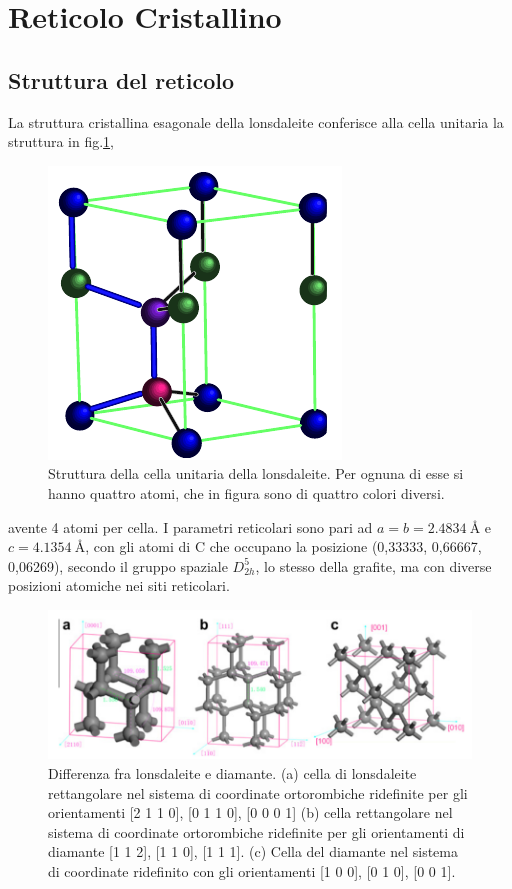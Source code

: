 \documentclass[a4paper,titlepage]{book}
\begin{document}
\section{Reticolo Cristallino}
\subsection{Struttura del reticolo}
La struttura cristallina esagonale della lonsdaleite conferisce alla cella unitaria la struttura in fig.\ref{lonsda},
\begin{figure}[h!] 
	\centering
	\includegraphics[width=0.5\columnwidth]{unitcelllonsda.png}
	\caption{ 	\label{lonsda}
		Struttura della cella unitaria della lonsdaleite. Per ognuna di esse si hanno quattro atomi, che in figura sono di quattro colori diversi.
	}
\end{figure}
avente 4 atomi per cella. I parametri reticolari sono pari ad $a = b = \SI{2.4834}{\angstrom}$ e $c = \SI{4.1354}{\angstrom}$, con gli atomi di C che occupano la posizione (0,33333, 0,66667, 0,06269), secondo il gruppo spaziale $D_{2h}^5$, lo stesso della grafite, ma con diverse posizioni atomiche nei siti reticolari.\\
\begin{figure}[h!] 
	\centering
	\includegraphics[width=0.8\columnwidth]{lonsdaleite.png}
	\caption{ 	\label{lonsdale}
		Differenza fra lonsdaleite e diamante. (a) cella di lonsdaleite rettangolare nel sistema di coordinate ortorombiche ridefinite per gli orientamenti [2 1 1 0], [0 1 1 0], [0 0 0 1] (b) cella rettangolare nel sistema di coordinate ortorombiche ridefinite per gli orientamenti di diamante [1 1 2], [1 1 0], [1 1 1]. (c) Cella del diamante nel sistema di coordinate ridefinito con gli orientamenti [1 0 0], [0 1 0], [0 0 1].
	}
\end{figure}
\end{document}
